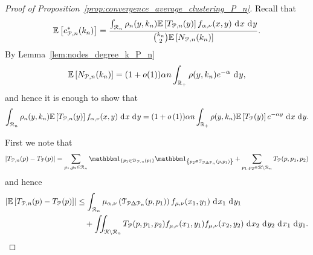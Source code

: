 \begin{proof}[Proof of Proposition~\ref{prop:convergence_average_clustering_P_n}]


Recall that
\[
	\Exp{c_{\Pcal,n}^\ast(k_n)} = \frac{\int_{\Rcal_n} \rho_n(y,k_n) \Exp{T_{\Pcal,n}(y)} f_{\alpha,\nu}(x,y) \dd x \dd y}{\binom{k_n}{2}\Exp{N_{\Pcal,n}(k_n)}}.
\]
By Lemma~\ref{lem:nodes_degree_k_P_n}
\[
	\Exp{N_{\Pcal,n}(k_n)} = (1+o(1)) \alpha n \int_{\R_+} \rho(y,k_n) e^{-\alpha} \dd y,
\]
and hence it is enough to show that
\[
	\int_{\Rcal_n} \rho_n(y,k_n) \Exp{T_{\Pcal,n}(y)} f_{\alpha,\nu}(x,y) \dd x \dd y
	= (1 + \smallO{1}) \alpha n \int_{\R_+} \rho(y,k_n) \Exp{T_\Pcal(y)} e^{-\alpha y} \dd x \dd y.
\]

First we note that
\begin{align*}
	\left|T_{\Pcal,n}(p) - T_{\Pcal}(p)\right| = \sum_{p_1, p_2 \in \Rcal_n} \ind{p_1 \in \BallPon{p}} \ind{p_2 \in \mathcal{T}_{\Pcal \Delta \Pcal_n}(p, p_1)} + \sum_{p_1, p_2 \in \Rcal \setminus \Rcal_n} T_{\Pcal}(p,p_1,p_2)
\end{align*}
and hence
\begin{align*}
	\left|\Exp{T_{\Pcal,n}(p) - T_{\Pcal}(p)}\right|
	&\le \int_{\Rcal_n} \mu_{\alpha, \nu}\left(\mathcal{T}_{\Pcal \Delta \Pcal_n}(p,p_1)\right) f_{\mu, \nu}(x_1,y_1) 
		\dd x_1 \dd y_1\\
	&\hspace{10pt}+ \iint_{\Rcal \setminus \Rcal_n} T_{\Pcal}(p,p_1,p_2) f_{\mu, \nu}(x_1,y_1) f_{\mu, \nu}(x_2,y_2)
		\dd x_2 \dd y_2 \dd x_1 \dd y_1. 
\end{align*}


\end{proof}
